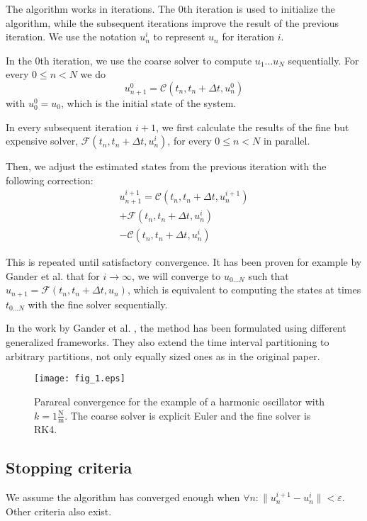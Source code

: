 \documentclass[conference]{IEEEtran}
\begin{document}
The algorithm works in iterations. The 0th iteration is used to initialize the algorithm, while the subsequent iterations improve the result of the previous iteration. We use the notation $u^i_n$ to represent $u_n$ for iteration $i$.

In the 0th iteration, we use the coarse solver to compute $u_1\dots u_N$ sequentially. For every $0 \leq n < N$ we do
$$
u^0_{n+1} = \mathcal{C}(t_n, t_n+\Delta t, u^0_n)
$$
with $u^0_0 = u_0$, which is the initial state of the system.

In every subsequent iteration $i+1$, we first calculate the results of the fine but expensive solver, $\mathcal{F}(t_n, t_n+\Delta t, u^{i}_n)$, for every $0 \leq n < N$ in parallel.

Then, we adjust the estimated states from the previous iteration with the following correction:
\begin{multline}
u^{i+1}_{n+1} = \mathcal{C}(t_n, t_n+\Delta t, u^{i+1}_n)\\ + \mathcal{F}(t_n, t_n+\Delta t, u^i_n)\\ - \mathcal{C}(t_n, t_n+\Delta t, u^{i}_n)
\end{multline}

This is repeated until satisfactory convergence. It has been proven for example by Gander et al. \cite{parareal2} that for $i \to \infty$, we will converge to $u_{0\dots N}$ such that $u_{n+1} = \mathcal{F}(t_n, t_n+\Delta t, u_n)$, which is equivalent to computing the states at times $t_{0\dots N}$ with the fine solver sequentially.

In the work by Gander et al. \cite{parareal2}, the method has been formulated using different generalized frameworks. They also extend the time interval partitioning to arbitrary partitions, not only equally sized ones as in the original paper. \cite{parareal}

\begin{figure}[htbp]
\centerline{\texttt{[image: fig\_1.eps]}}
\caption{Parareal convergence for the example of a harmonic oscillator with $k = 1\frac{\text{N}}{\text{m}}$. The coarse solver is explicit Euler and the fine solver is RK4.}
\label{oscillator}
\end{figure}

\subsection*{Stopping criteria}
We assume the algorithm has converged enough when $\forall n\colon \|u^{i+1}_n - u^i_n\| < \varepsilon$. Other criteria also exist. \cite{speedup}
\end{document}
